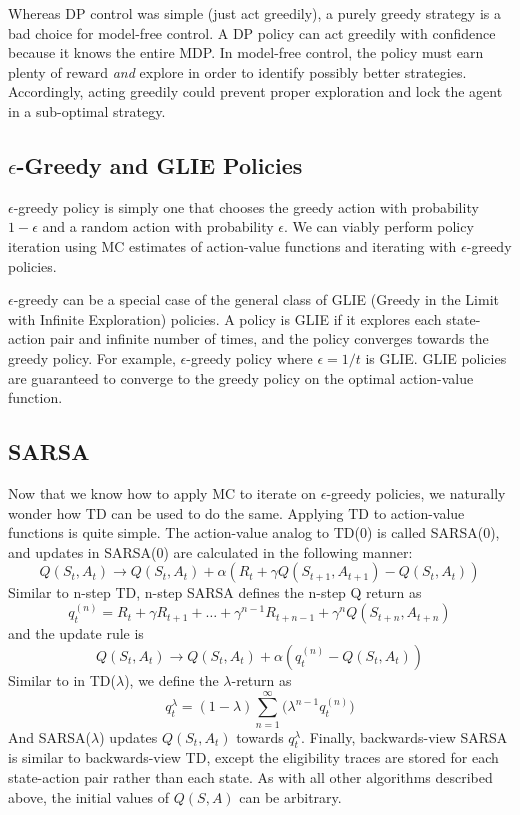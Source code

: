 \documentclass{article}
\newcommand{\ita}{\textit}
\newcommand{\eps}{\epsilon}
\begin{document}
Whereas DP control was simple (just act greedily), a purely greedy strategy is a bad choice for model-free control. A DP policy can act greedily with confidence because it knows the entire MDP. In model-free control, the policy must earn plenty of reward \ita{and} explore in order to identify possibly better strategies. Accordingly, acting greedily could prevent proper exploration and lock the agent in a sub-optimal strategy.

\subsection{$\eps$-Greedy and GLIE Policies}

$\eps$-greedy policy is simply one that chooses the greedy action with probability $1-\eps$ and a random action with probability $\eps$. We can viably perform policy iteration using MC estimates of action-value functions and iterating with $\eps$-greedy policies.

$\eps$-greedy can be a special case of the general class of GLIE (Greedy in the Limit with Infinite Exploration) policies. A policy is GLIE if it explores each state-action pair and infinite number of times, and the policy converges towards the greedy policy. For example, $\eps$-greedy policy where $\eps = 1/t$ is GLIE. GLIE policies are guaranteed to converge to the greedy policy on the optimal action-value function.

\subsection{SARSA}

Now that we know how to apply MC to iterate on $\eps$-greedy policies, we naturally wonder how TD can be used to do the same. Applying TD to action-value functions is quite simple. The action-value analog to TD(0) is called SARSA(0), and updates in SARSA(0) are calculated in the following manner:
$$Q(S_t, A_t) \rightarrow Q(S_t, A_t) + \alpha(R_t + \gamma Q(S_{t+1}, A_{t+1}) - Q(S_t, A_t))$$
Similar to n-step TD, n-step SARSA defines the n-step Q return as
$$q^{(n)}_t = R_t + \gamma R_{t+1} + \ldots + \gamma^{n-1}R_{t+n-1} + \gamma^nQ(S_{t+n}, A_{t+n})$$
and the update rule is
$$Q(S_t, A_t) \rightarrow Q(S_t, A_t) + \alpha(q^{(n)}_t - Q(S_t, A_t))$$
Similar to in TD($\lambda$), we define the $\lambda$-return as
$$q^\lambda_t = (1-\lambda)\sum_{n=1}^\infty\bigg(\lambda^{n-1}q^{(n)}_t\bigg)$$
And SARSA($\lambda$) updates $Q(S_t, A_t)$ towards $q^\lambda_t$. Finally, backwards-view SARSA is similar to backwards-view TD, except the eligibility traces are stored for each state-action pair rather than each state. As with all other algorithms described above, the initial values of $Q(S, A)$ can be arbitrary. 
\end{document}
